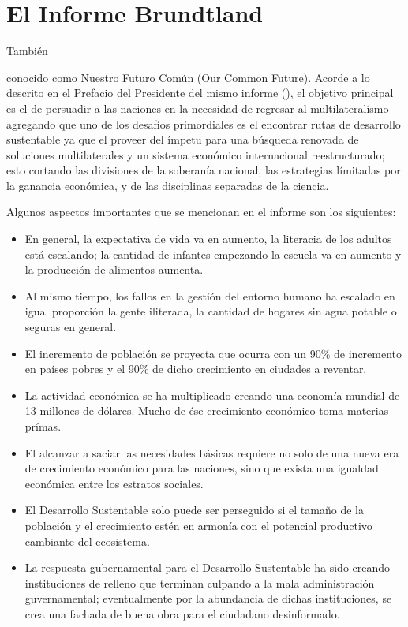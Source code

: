 \documentclass[stu, 12pt, letterpaper, donotrepeattitle, floatsintext, natbib]{apa7}
\begin{document}
\section{El Informe Brundtland}
También \begin{justifying}conocido como Nuestro Futuro Común (Our Common Future). Acorde a lo descrito en el Prefacio del Presidente del mismo informe (\citeyear{world-commission-on-environment-and-development-1987}), el objetivo principal es el de persuadir a las naciones en la necesidad de regresar al multilateralísmo agregando que uno de los desafíos primordiales
es el encontrar rutas de desarrollo sustentable ya que el proveer del ímpetu para una búsqueda renovada de soluciones multilaterales y un sistema económico internacional reestructurado; esto
cortando las divisiones de la soberanía nacional, las estrategias límitadas por la ganancia económica, y de las disciplinas separadas de la ciencia.\par
\vspace{\baselineskip}
Algunos aspectos importantes que se mencionan en el informe son los siguientes:
\begin{itemize}
    \item En general, la expectativa de vida va en aumento, la literacia de los adultos está escalando; la cantidad de infantes empezando la escuela va en aumento y la producción de alimentos aumenta.
    \item Al mismo tiempo, los fallos en la gestión del entorno humano ha escalado en igual proporción la gente iliterada, la cantidad de hogares sin agua potable o seguras en general.
    \item El incremento de población se proyecta que ocurra con un 90\% de incremento en países pobres y el 90\% de dicho crecimiento en ciudades a reventar.
    \item La actividad económica se ha multiplicado creando una economía mundial de 13 millones de dólares. Mucho de ése crecimiento económico toma materias prímas.
    \item El alcanzar a saciar las necesidades básicas requiere no solo de una nueva era de crecimiento económico para las naciones, sino que exista una igualdad económica entre los estratos sociales.
    \item El Desarrollo Sustentable solo puede ser perseguido si el tamaño de la población y el crecimiento estén en armonía con el potencial productivo cambiante del ecosistema.
    \item La respuesta gubernamental para el Desarrollo Sustentable ha sido creando instituciones de relleno que terminan culpando a la mala administración guvernamental; eventualmente por la abundancia de dichas instituciones, se crea una fachada de buena obra para el ciudadano desinformado.
\end{itemize}\par\end{justifying}
\vspace{\baselineskip}
\end{document}

